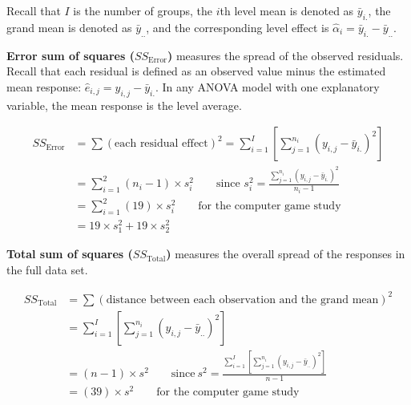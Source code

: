 \documentclass[
]{report}
\begin{document}
Recall that \(\scriptstyle I\) is the number of groups, the \(\scriptstyle i\)th level mean is denoted as \(\scriptstyle \bar{y}_{i.}\), the grand mean is denoted as \(\scriptstyle \bar{y}_{..}\), and the corresponding level effect is \(\scriptstyle \hat{\alpha}_i = \bar{y}_{i.} - \bar{y}_{..}\).

\textbf{Error sum of squares (\(\scriptstyle SS_{\text{Error}}\))} measures the spread of the observed residuals. Recall that each residual is defined as an observed value minus the estimated mean response: \(\scriptstyle \hat{e}_{i,j} = y_{i,j} - \bar{y}_{i.}\). In any ANOVA model with one explanatory variable, the mean response is the level average.

\begin{equation}
\label{2_11}
\begin{split}
SS_{\text{Error}} & = \sum (\text{each residual effect})^2 
                    = \sum_{i=1}^{I} \left[ \sum_{j=1}^{n_i} (y_{i,j} - \bar{y}_{i.})^2  \right] \\
                  & = \sum_{i=1}^{2} (n_i - 1) \times s_i^2 
                    \qquad \text{since } s_i^2 = \frac{\sum_{j=1}^{n_i} (y_{i,j} - \bar{y}_{i.})^2}{n_i - 1} \\
                  & = \sum_{i=1}^{2} (19) \times s_i^2 
                    \qquad \text{for the computer game study} \\
                  & = 19 \times s_1^2 + 19 \times s_2^2
\end{split}
\tag{2.11}
\end{equation}

\textbf{Total sum of squares (\(\scriptstyle SS_{\text{Total}}\))} measures the overall spread of the responses in the full data set.

\begin{equation}
\label{2_12}
\begin{split}
SS_{\text{Total}} &= \sum (\text{distance between each observation and the grand mean})^2 \\
&= \sum_{i=1}^{I} \left[ \sum_{j=1}^{n_i} (y_{i,j} - \bar{y}_{..})^2 \right] \\
&= (n - 1) \times s^2 \qquad \text{since} \ s^2 = \frac{ \sum_{i=1}^{I} \left[ \sum_{j=1}^{n_i} (y_{i,j} - \bar{y}_{..})^2 \right] }{n - 1} \\
&= (39) \times s^2 \qquad \text{for the computer game study}
\end{split}
\tag{2.12}
\end{equation}
\end{document}
